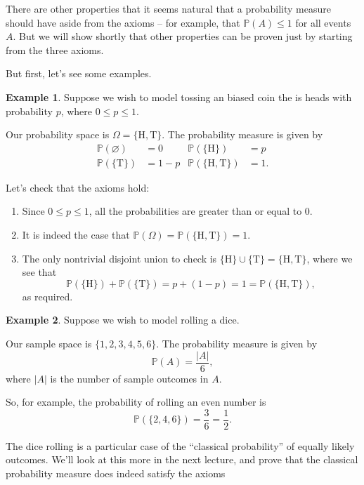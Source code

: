 \documentclass[
  a4paper,
]{book}
\providecommand{\tightlist}{%
  \setlength{\itemsep}{0pt}\setlength{\parskip}{0pt}}
\theoremstyle{definition}
\theoremstyle{definition}
\newtheorem{example}{Example}[chapter]
\theoremstyle{definition}
\theoremstyle{definition}
\theoremstyle{remark}
\begin{document}
There are other properties that it seems natural that a probability measure should have aside from the axioms -- for example, that \(\mathbb P(A) \leq 1\) for all events \(A\). But we will show shortly that other properties can be proven just by starting from the three axioms.

But first, let's see some examples.

\begin{example}

Suppose we wish to model tossing an biased coin the is heads with probability \(p\), where \(0 \leq p \leq 1\).

Our probability space is \(\Omega = \{\text{H}, \text{T}\}\). The probability measure is given by
\begin{align*}
   \mathbb P(\varnothing) &= 0  &  \mathbb P(\{\text{H}\}) &= p \\
   \mathbb P(\{\text{T}\}) &= 1 - p  &  \mathbb P(\{\text{H},\text{T}\})  &= 1 .
\end{align*}

Let's check that the axioms hold:

\begin{enumerate}
\def\labelenumi{\arabic{enumi}.}
\tightlist
\item
  Since \(0 \leq p \leq 1\), all the probabilities are greater than or equal to 0.
\item
  It is indeed the case that \(\mathbb P(\Omega) = \mathbb P(\{\text{H},\text{T}\}) = 1\).
\item
  The only nontrivial disjoint union to check is \(\{\text{H}\} \cup \{\text{T}\} = \{\text{H},\text{T}\}\), where we see that
  \[ \mathbb P(\{\text{H}\}) + \mathbb P(\{\text{T}\}) = p + (1 - p) = 1 = \mathbb P(\{\text{H},\text{T}\}) , \]
  as required.
\end{enumerate}

\end{example}

\begin{example}
Suppose we wish to model rolling a dice.

Our sample space is \(\{1,2,3,4,5,6\}\). The probability measure is given by
\[ \mathbb P(A) = \frac{|A|}{6} , \]
where \(|A|\) is the number of sample outcomes in \(A\).

So, for example, the probability of rolling an even number is
\[ \mathbb P(\{2,4,6\}) = \frac36 = \frac12 . \]
\end{example}

The dice rolling is a particular case of the ``classical probability'' of equally likely outcomes. We'll look at this more in the next lecture, and prove that the classical probability measure does indeed satisfy the axioms
\end{document}
